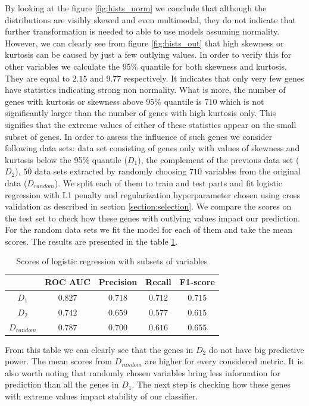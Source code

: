 \documentclass[shortabstract, english, mgr]{iithesis}
\begin{document}
By looking at the figure \ref{fig:hists_norm} we conclude that although the distributions are visibly skewed and even multimodal, they do not indicate that further transformation is needed to able to use models assuming normality. However, we can clearly see from figure \ref{fig:hists_out} that high skewness or kurtosis can be caused by just a few outlying values. In order to verify this for other variables we calculate the 95\% quantile for both skewness and kurtosis. They are equal to $2.15$ and $9.77$ respectively. It indicates that only very few genes have statistics indicating strong non normality. What is more, the number of genes with kurtosis or skewness above 95\% quantile is $710$ which is not significantly larger than the number of genes with high kurtosis only. This signifies that the extreme values of either of these statistics appear on the small subset of genes. In order to assess the influence of such genes we consider following data sets: data set consisting of genes only with values of skewness and kurtosis below the 95\% quantile ($D_1$), the complement of the previous data set ($D_2$), $50$ data sets extracted by randomly choosing $710$ variables from the original data ($D_{random}$). We split each of them to train and test parts and fit logistic regression with L1 penalty and regularization hyperparameter chosen using cross validation as described in section \ref{section:selection}. We compare the scores on the test set to check how these genes with outlying values impact our prediction. For the random data sets we fit the model for each of them and take the mean scores. The results are presented in the table \ref{tab:scores-trunc}.
\begin{table}
\centering
    \begin{tabular}[t]{c c c c c}
    \toprule
    & ROC AUC & Precision & Recall & F1-score\\
    \midrule
    $D_1$ & $0.827$ & $0.718$ &	$0.712$ & $0.715$ \\
    $D_2$ & $0.742$ & $0.659$ & $0.577$ & $0.615$ \\
    $D_{random}$ & $0.787$ & $0.700$ & $0.616$ & $0.655$ \\
    \bottomrule
\end{tabular}
    \caption{Scores of logistic regression with subsets of variables}
    \label{tab:scores-trunc}
\end{table}

From this table we can clearly see that the genes in $D_2$ do not have big predictive power. The mean scores from $D_{random}$ are higher for every considered metric. It is also worth noting that randomly chosen variables bring less information for prediction than all the genes in $D_1$. The next step is checking how these genes with extreme values impact stability of our classifier.
\end{document}
